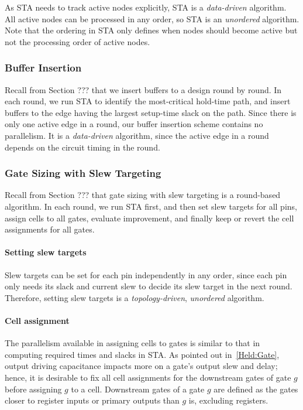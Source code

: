 As STA needs to track active nodes explicitly, STA is a {\em data-driven} algorithm. All active nodes can be processed in any order, so STA is an {\em unordered} algorithm. Note that the ordering in STA only defines when nodes should become active but not the processing order of active nodes.

\subsubsection{Buffer Insertion}

Recall from Section ??? that we insert buffers to a design round by round. In each round, we run STA to identify the most-critical hold-time path, and insert buffers to the edge having the largest setup-time slack on the path. Since there is only one active edge in a round, our buffer insertion scheme contains no parallelism. It is a {\em data-driven} algorithm, since the active edge in a round depends on the circuit timing in the round.

\subsubsection{Gate Sizing with Slew Targeting}

Recall from Section ??? that gate sizing with slew targeting is a round-based algorithm. In each round, we run STA first, and then set slew targets for all pins, assign cells to all gates, evaluate improvement, and finally keep or revert the cell assignments for all gates.

\paragraph{Setting slew targets} Slew targets can be set for each pin independently in any order, since each pin only needs its slack and current slew to decide its slew target in the next round. Therefore, setting slew targets is a {\em topology-driven}, {\em unordered} algorithm.

\paragraph{Cell assignment} The parallelism available in assigning cells to gates is similar to that in computing required times and slacks in STA. As pointed out in~\ref{Held:Gate}, output driving capacitance impacts more on a gate's output slew and delay; hence, it is desirable to fix all cell assignments for the downstream gates of gate $g$ before assigning $g$ to a cell. Downstream gates of a gate $g$ are defined as the gates closer to register inputs or primary outputs than $g$ is, excluding registers.

